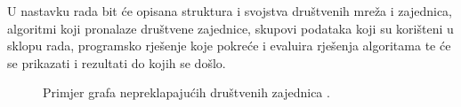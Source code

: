 U nastavku rada bit će opisana struktura i svojstva društvenih mreža i zajednica, algoritmi koji pronalaze društvene zajednice, skupovi podataka koji su korišteni u sklopu rada, programsko rješenje koje pokreće i evaluira rješenja algoritama te će se prikazati i rezultati  do kojih se došlo. 


\begin{figure}
	\caption{Primjer grafa nepreklapajućih društvenih zajednica \cite{jayawickrama_2021}.}
	\label{fig:comm1}
\end{figure}
